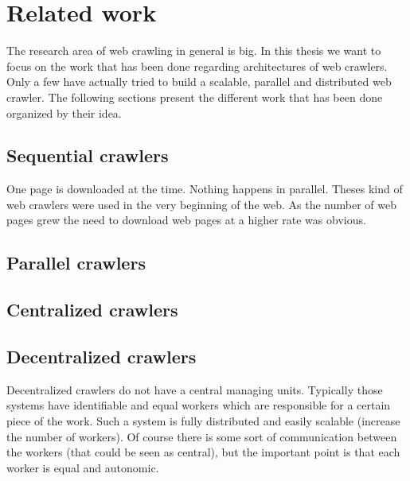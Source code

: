 
\chapter{Related work} %

The research area of web crawling in general is big. In this thesis we want to focus on the work that has been done regarding architectures of web crawlers. Only a few have actually tried to build a scalable, parallel and distributed web crawler. The following sections present the different work that has been done organized by their idea.

\label{Chapter2} %


\section{Sequential crawlers}
One page is downloaded at the time. Nothing happens in parallel. Theses kind of web crawlers were used in the very beginning of the web. As the number of web pages grew the need to download web pages at a higher rate was obvious.


\section{Parallel crawlers}
\section{Centralized crawlers}
\section{Decentralized crawlers}
Decentralized crawlers do not have a central managing units. Typically those systems have identifiable and equal workers which are responsible for a certain piece of the work. Such a system is fully distributed and easily scalable (increase the number of workers). Of course there is some sort of communication between the workers (that could be seen as central), but the important point is that each worker is equal and autonomic.

